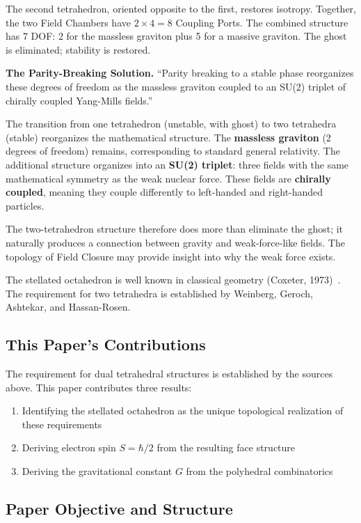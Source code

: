 \documentclass[aps,prd,preprint,superscriptaddress,showpacs,preprintnumbers,amsmath,amssymb,nofootinbib]{revtex4-2}
\begin{document}
The second tetrahedron, oriented opposite to the first, restores isotropy. Together, the two Field Chambers have $2 \times 4 = 8$ Coupling Ports. The combined structure has 7 DOF: 2 for the massless graviton plus 5 for a massive graviton. The ghost is eliminated; stability is restored.

\textbf{The Parity-Breaking Solution.} ``Parity breaking to a stable phase reorganizes these degrees of freedom as the massless graviton coupled to an SU(2) triplet of chirally coupled Yang-Mills fields.''~\cite{alexander2014}

The transition from one tetrahedron (unstable, with ghost) to two tetrahedra (stable) reorganizes the mathematical structure. The \textbf{massless graviton} (2 degrees of freedom) remains, corresponding to standard general relativity. The additional structure organizes into an \textbf{SU(2) triplet}: three fields with the same mathematical symmetry as the weak nuclear force. These fields are \textbf{chirally coupled}, meaning they couple differently to left-handed and right-handed particles.

The two-tetrahedron structure therefore does more than eliminate the ghost; it naturally produces a connection between gravity and weak-force-like fields. The topology of Field Closure may provide insight into why the weak force exists.

The stellated octahedron is well known in classical geometry (Coxeter, 1973)~\cite{coxeter1973}. The requirement for two tetrahedra is established by Weinberg, Geroch, Ashtekar, and Hassan-Rosen.

\subsection{This Paper's Contributions}
\label{subsec:contributions}

The requirement for dual tetrahedral structures is established by the sources above. This paper contributes three results:
\begin{enumerate}
\item Identifying the stellated octahedron as the unique topological realization of these requirements
\item Deriving electron spin $S = \hbar/2$ from the resulting face structure
\item Deriving the gravitational constant $G$ from the polyhedral combinatorics
\end{enumerate}

\subsection{Paper Objective and Structure}
\label{subsec:objective}
\end{document}

